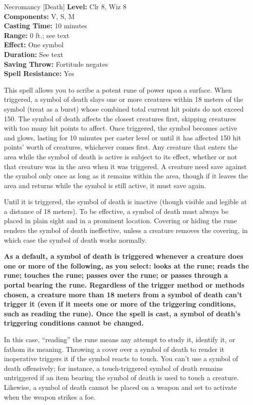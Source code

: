 {Necromancy [Death]}
{
	\textbf{Level:}
	Clr 8, Wiz 8\\
	\textbf{Components:}
	V, S, M\\
	\textbf{Casting Time:}
	10 minutes\\
	\textbf{Range:}
	0 ft.; see text\\
	\textbf{Effect:}
	One symbol\\
	\textbf{Duration:}
	See text\\
	\textbf{Saving Throw:}
	Fortitude negates\\
	\textbf{Spell Resistance:}
	Yes\\
}
{
	This spell allows you to scribe a potent rune of power upon a surface. When triggered, a symbol of death slays one or more creatures within 18 meters of the symbol (treat as a burst) whose combined total current hit points do not exceed 150. The symbol of death affects the closest creatures first, skipping creatures with too many hit points to affect. Once triggered, the symbol becomes active and glows, lasting for 10 minutes per caster level or until it has affected 150 hit points' worth of creatures, whichever comes first. Any creature that enters the area while the symbol of death is active is subject to its effect, whether or not that creature was in the area when it was triggered. A creature need save against the symbol only once as long as it remains within the area, though if it leaves the area and returns while the symbol is still active, it must save again.

	Until it is triggered, the symbol of death is inactive (though visible and legible at a distance of 18 meters). To be effective, a symbol of death must always be placed in plain sight and in a prominent location. Covering or hiding the rune renders the symbol of death ineffective, unless a creature removes the covering, in which case the symbol of death works normally.

	\textbf{	As a default, a symbol of death is triggered whenever a creature does one or more of the following, as you select: looks at the rune; reads the rune; touches the rune; passes over the rune; or passes through a portal bearing the rune. Regardless of the trigger method or methods chosen, a creature more than 18 meters from a symbol of death can't trigger it (even if it meets one or more of the triggering conditions, such as reading the rune). Once the spell is cast, a symbol of death's triggering conditions cannot be changed.}

	In this case, ``reading'' the rune means any attempt to study it, identify it, or fathom its meaning. Throwing a cover over a symbol of death to render it inoperative triggers it if the symbol reacts to touch. You can't use a symbol of death offensively; for instance, a touch-triggered symbol of death remains untriggered if an item bearing the symbol of death is used to touch a creature. Likewise, a symbol of death cannot be placed on a weapon and set to activate when the weapon strikes a foe.

}

